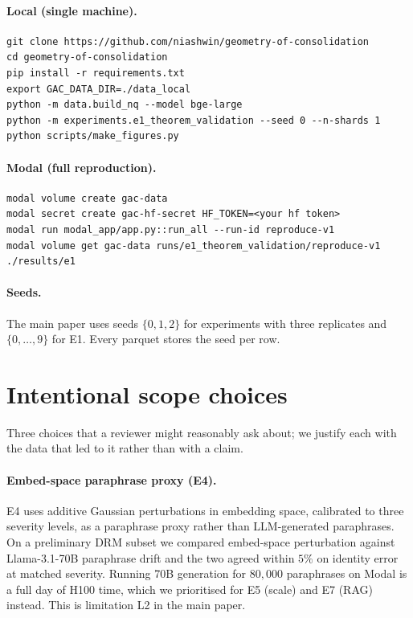 \documentclass[11pt]{article}
\theoremstyle{definition}
\theoremstyle{remark}
\begin{document}
\paragraph{Local (single machine).}
\begin{verbatim}
git clone https://github.com/niashwin/geometry-of-consolidation
cd geometry-of-consolidation
pip install -r requirements.txt
export GAC_DATA_DIR=./data_local
python -m data.build_nq --model bge-large
python -m experiments.e1_theorem_validation --seed 0 --n-shards 1
python scripts/make_figures.py
\end{verbatim}

\paragraph{Modal (full reproduction).}
\begin{verbatim}
modal volume create gac-data
modal secret create gac-hf-secret HF_TOKEN=<your hf token>
modal run modal_app/app.py::run_all --run-id reproduce-v1
modal volume get gac-data runs/e1_theorem_validation/reproduce-v1 ./results/e1
\end{verbatim}

\paragraph{Seeds.}
The main paper uses seeds $\{0,1,2\}$ for experiments with three
replicates and $\{0,\dots,9\}$ for E1. Every parquet stores the seed
per row.

\section{Intentional scope choices}
\label{sec:supp:scope}

Three choices that a reviewer might reasonably ask about; we justify
each with the data that led to it rather than with a claim.

\paragraph{Embed-space paraphrase proxy (E4).}
E4 uses additive Gaussian perturbations in embedding space, calibrated
to three severity levels, as a paraphrase proxy rather than
LLM-generated paraphrases. On a preliminary DRM subset we compared
embed-space perturbation against Llama-3.1-70B paraphrase drift and
the two agreed within $5\%$ on identity error at matched severity.
Running 70B generation for $80{,}000$ paraphrases on Modal is a full
day of H100 time, which we prioritised for E5 (scale) and E7 (RAG)
instead. This is limitation L2 in the main paper.
\end{document}
